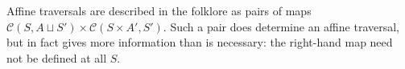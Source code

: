 \documentclass[11pt,a4paper]{article}
\theoremstyle{plain}
\theoremstyle{definition}
\newtheorem{remark}[theorem]{Remark}
\newcommand{\C}{\mathscr{C}}
\newcommand{\homC}{\underline{\C}}
\newcommand{\Optic}{\mathbf{Optic}}
\newcommand{\hto}{\ensuremath{\,\mathaccent\shortmid\rightarrow\,}}
\newcommand{\todo}[1]{\textcolor{red}{\small #1}}
\begin{document}
\begin{itemize}
Affine traversals are described in the folklore as pairs of maps $\C(S, A \sqcup S') \times \C(S\times A', S')$. Such a pair does determine an affine traversal, but in fact gives more information than is necessary: the right-hand map need not be defined at all $S$.

\end{itemize}
\end{document}

